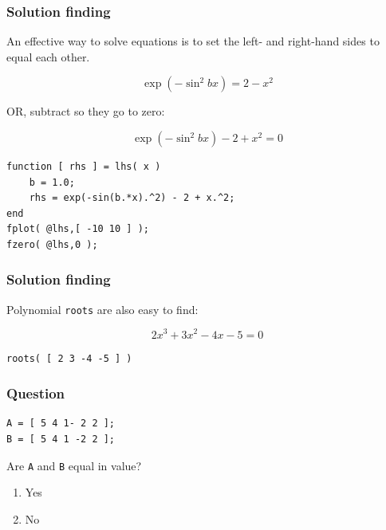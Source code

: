 \documentclass[11pt]{beamer}
\begin{document}
\begin{frame}[fragile]
  \frametitle{Solution finding}
  \Enlarge

  \begin{enumerate}
  \myitem  An effective way to solve equations is to set the left- and right-hand sides to equal each other.
  \end{enumerate}
  $$
\exp\left( -\sin^2 bx \right)
=
2 - x^2
  $$
  \begin{enumerate}
  \myitem  OR, subtract so they go to zero:
  \end{enumerate}
  $$
\exp\left( -\sin^2 bx \right) - 2 + x^2
=
0
  $$
  \begin{Verbatim}
function [ rhs ] = lhs( x )
    b = 1.0;
    rhs = exp(-sin(b.*x).^2) - 2 + x.^2;
end
fplot( @lhs,[ -10 10 ] );
fzero( @lhs,0 );
  \end{Verbatim}
\end{frame}

\begin{frame}[fragile]
  \frametitle{Solution finding}
  \Enlarge

  \begin{enumerate}
  \myitem  Polynomial \texttt{roots} are also easy to find:
  \end{enumerate}
  $$
2 x^3 + 3 x^2 - 4 x - 5 = 0
  $$
  \begin{Verbatim}
roots( [ 2 3 -4 -5 ] )
  \end{Verbatim}
\end{frame}

\begin{frame}[fragile]
  \frametitle{Question}
  \Enlarge

  \begin{Verbatim}
A = [ 5 4 1- 2 2 ];
B = [ 5 4 1 -2 2 ];
  \end{Verbatim}

Are \texttt{A} and \texttt{B} equal in value?

  \begin{enumerate}[label=\Alph*]
    \item  Yes
    \item  No
  \end{enumerate}
\end{frame}
\end{document}
